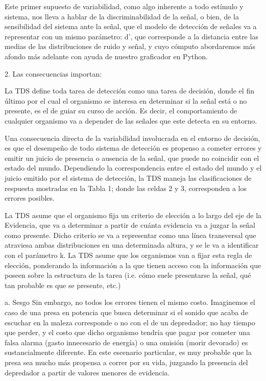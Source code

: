 Este primer supuesto de variabilidad, como algo inherente a todo estímulo y sistema, nos lleva a hablar de la discriminabilidad de la señal, o bien, de la sensibilidad del sistema ante la señal, que el modelo de detección de señales va a representar con un mismo parámetro: d’, que corresponde a la distancia entre las medias de las distribuciones de ruido y señal, y cuyo cómputo abordaremos más afondo más adelante con ayuda de nuestro graficador en Python. 

2.	Las consecuencias importan:

La TDS define toda tarea de detección como una tarea de decisión, donde el fin último por el cual el organismo se interesa en determinar si la señal está o no presente, es el de guiar su curso de acción. Es decir, el comportamiento de cualquier organismo va a depender de las señales que este detecta en su entorno.

Una consecuencia directa de la variabilidad involucrada en el entorno de decisión, es que el desempeño de todo sistema de detección es propenso a cometer errores y emitir un juicio de presencia o ausencia de la señal, que puede no coincidir con el estado del mundo. Dependiendo la correspondencia entre el estado del mundo y el juicio emitido por el sistema de detección, la TDS maneja las clasificaciones de respuesta mostradas en la Tabla 1; donde las celdas 2 y 3, corresponden a los errores posibles.

La TDS asume que el organismo fija un criterio de elección a lo largo del eje de la Evidencia, que va a determinar a partir de cuánta evidencia va a juzgar la señal como presente. Dicho criterio se va a representar como una línea transversal que atraviesa ambas distribuciones en una determinada altura, y se le va a identificar con el parámetro k. La TDS asume que los organismos van a fijar esta regla de elección, ponderando la información a la que tienen acceso con la información que poseen sobre la estructura de la tarea (i.e. cómo suele presentarse la señal, qué tan probable es que se presente, etc.)

a.	Sesgo
Sin embargo, no todos los errores tienen el mismo costo. Imaginemos el caso de una presa en potencia que busca determinar si el sonido que acaba de escuchar en la maleza corresponde o no con el de un depredador; no hay tiempo que perder, y el costo que dicho organismo tendría que pagar por cometer una falsa alarma (gasto innecesario de energía) o una omisión (morir devorado) es sustancialmente diferente. En este escenario particular, es muy probable que la presa sea mucho más propensa a correr por su vida, juzgando la presencia del depredador a partir de valores menores de evidencia.

